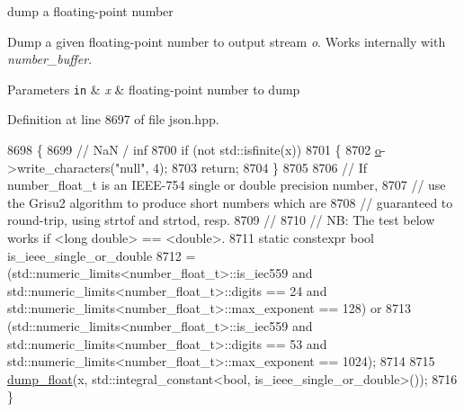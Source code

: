 dump a floating-\/point number 

Dump a given floating-\/point number to output stream {\itshape o}. Works internally with {\itshape number\+\_\+buffer}.


\begin{DoxyParams}[1]{Parameters}
\mbox{\tt in}  & {\em x} & floating-\/point number to dump \\
\hline
\end{DoxyParams}


Definition at line 8697 of file json.\+hpp.


\begin{DoxyCode}
8698     \{
8699         \textcolor{comment}{// NaN / inf}
8700         \textcolor{keywordflow}{if} (not std::isfinite(x))
8701         \{
8702             \hyperlink{classnlohmann_1_1detail_1_1serializer_acf3c88660d3cbc65fc71c4d84f2a9f59}{o}->write\_characters(\textcolor{stringliteral}{"null"}, 4);
8703             \textcolor{keywordflow}{return};
8704         \}
8705 
8706         \textcolor{comment}{// If number\_float\_t is an IEEE-754 single or double precision number,}
8707         \textcolor{comment}{// use the Grisu2 algorithm to produce short numbers which are}
8708         \textcolor{comment}{// guaranteed to round-trip, using strtof and strtod, resp.}
8709         \textcolor{comment}{//}
8710         \textcolor{comment}{// NB: The test below works if <long double> == <double>.}
8711         \textcolor{keyword}{static} constexpr \textcolor{keywordtype}{bool} is\_ieee\_single\_or\_double
8712             = (std::numeric\_limits<number\_float\_t>::is\_iec559 and 
      std::numeric\_limits<number\_float\_t>::digits == 24 and std::numeric\_limits<number\_float\_t>::max\_exponent == 128) or
8713               (std::numeric\_limits<number\_float\_t>::is\_iec559 and 
      std::numeric\_limits<number\_float\_t>::digits == 53 and std::numeric\_limits<number\_float\_t>::max\_exponent == 1024);
8714 
8715         \hyperlink{classnlohmann_1_1detail_1_1serializer_a6d652a3bfa581cf1cd7790d6d11ea52f}{dump\_float}(x, std::integral\_constant<bool, is\_ieee\_single\_or\_double>());
8716     \}
\end{DoxyCode}
\mbox{\label{classnlohmann_1_1detail_1_1serializer_a24b0fe45dc774441237bde198a133d8a}} 
